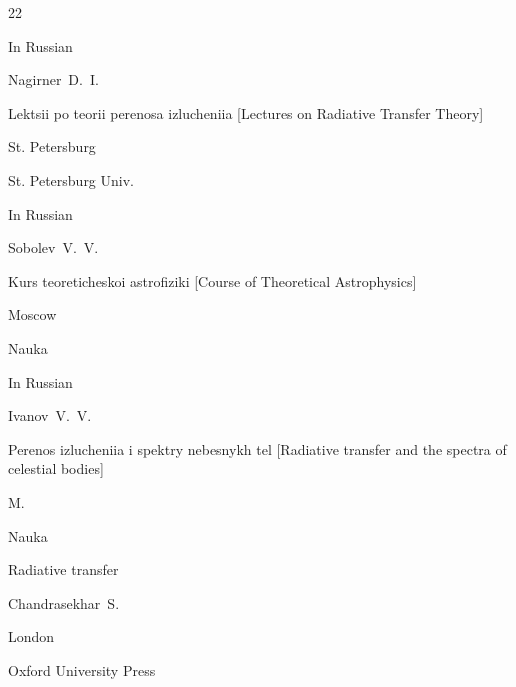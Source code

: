 




\EngRef



\begin{thebibliography}{22}




\lang In Russian

\by Nagirner~D.~I.

\book Lektsii po teorii perenosa izlucheniia \rm [Lectures on Radiative Transfer Theory]

\publaddr St. Petersburg

\publ St. Petersburg Univ.








\lang In Russian

\by Sobolev~V.~V.

\book Kurs teoreticheskoi astrofiziki \rm [Course of Theoretical Astrophysics]

\publaddr Moscow

\publ Nauka






\lang In Russian

\by Ivanov~V.~V.

\book Perenos izlucheniia i spektry nebesnykh tel \rm [Radiative transfer and the spectra of celestial bodies]

\publaddr M.

\publ Nauka








\book Radiative transfer

\by Chandrasekhar~S.

\publaddr London 

\publ Oxford University Press






\end{thebibliography}
